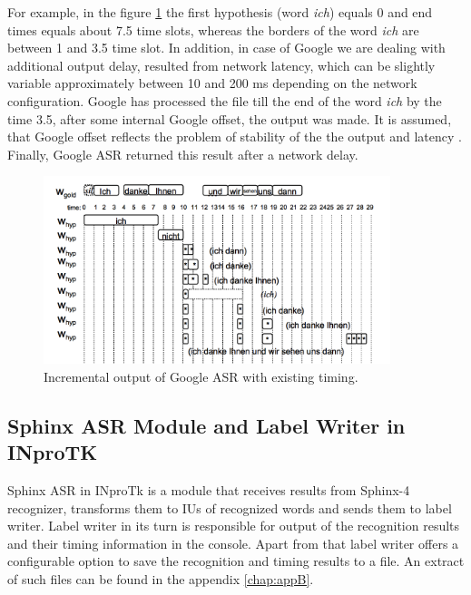 For example, in the figure  \ref {fig:google_ouput} the first hypothesis (word
\textit {ich}) equals 0 and end times equals about 7.5 time slots, whereas the
borders of the word \textit {ich} are between 1 and 3.5 time slot. In addition,
in case of Google we are dealing with additional output delay, resulted from network latency, which can be slightly variable approximately
between 10 and 200 ms depending on the network configuration. Google has
processed the file till the end of the word \textit {ich} by the time 3.5,
after some internal Google offset, the output was made.
It is assumed, that Google offset reflects the problem of stability of the
the output and latency \parencite {mcgrawgrauenstein2012}. Finally, Google ASR returned this result after 
a network delay.  
\begin{figure}[htbp]
  \centering
   \includegraphics[width=0.9\textwidth]{images/google_output.png}
  \caption{Incremental output of Google ASR with existing timing.}
  \label{fig:google_ouput}
\end{figure}

 
\subsection {Sphinx ASR Module and Label Writer in INproTK}
Sphinx ASR in INproTk is a module that receives results from Sphinx-4
recognizer, transforms them to IUs of recognized words and sends them
to label writer.   Label writer in its turn
is responsible for output of the recognition results and  their timing
information in the console. Apart from that label writer  offers a configurable
option to save the recognition and timing results to a file. An extract of such
files can be found in the appendix \ref{chap:appB}. 

